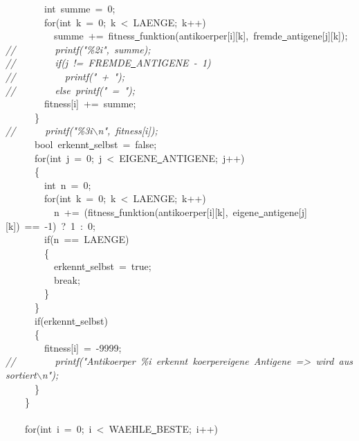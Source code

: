 {\ \ \ \ \ \ \ \ int\ summe\ =\ 0;\\
\ \ \ \ \ \ \ \ for(int\ k\ =\ 0;\ k\ <{}\ LAENGE;\ k++)\\
\ \ \ \ \ \ \ \ \ \ summe\ +=\ fitness\underline\ funktion(antikoerper[i][k],\ fremde\underline\ antigene[j][k]);\\
\textsl{//\ \ \ \ \ \ \ \ printf("{}\%2i"{},\ summe);}\\
\textsl{//\ \ \ \ \ \ \ \ if(j\ !=\ FREMDE\underline\ ANTIGENE\ -{}\ 1)}\\
\textsl{//\ \ \ \ \ \ \ \ \ \ printf("{}\ +\ "{});}\\
\textsl{//\ \ \ \ \ \ \ \ else\ printf("{}\ =\ "{});}\\
\ \ \ \ \ \ \ \ fitness[i]\ +=\ summe;\\
\ \ \ \ \ \ \}\\
\textsl{//\ \ \ \ \ \ printf("{}\%3i$\backslash$n"{},\ fitness[i]);}\\
\ \ \ \ \ \ bool\ erkennt\underline\ selbst\ =\ false;\\
\ \ \ \ \ \ for(int\ j\ =\ 0;\ j\ <{}\ EIGENE\underline\ ANTIGENE;\ j++)\\
\ \ \ \ \ \ \{\\
\ \ \ \ \ \ \ \ int\ n\ =\ 0;\\
\ \ \ \ \ \ \ \ for(int\ k\ =\ 0;\ k\ <{}\ LAENGE;\ k++)\\
\ \ \ \ \ \ \ \ \ \ n\ +=\ (fitness\underline\ funktion(antikoerper[i][k],\ eigene\underline\ antigene[j][k])\ ==\ -{}1)\ ?\ 1\ :\ 0;\\
\ \ \ \ \ \ \ \ if(n\ ==\ LAENGE)\\
\ \ \ \ \ \ \ \ \{\\
\ \ \ \ \ \ \ \ \ \ erkennt\underline\ selbst\ =\ true;\\
\ \ \ \ \ \ \ \ \ \ break;\\
\ \ \ \ \ \ \ \ \}\\
\ \ \ \ \ \ \}\\
\ \ \ \ \ \ if(erkennt\underline\ selbst)\\
\ \ \ \ \ \ \{\\
\ \ \ \ \ \ \ \ fitness[i]\ =\ -{}9999;\\
\textsl{//\ \ \ \ \ \ \ \ printf("{}Antikoerper\ \%i\ erkennt\ koerpereigene\ Antigene\ =>{}\ wird\ aussortiert$\backslash$n"{});}\\
\ \ \ \ \ \ \}\\
\ \ \ \ \}\\
\ \\
\ \ \ \ for(int\ i\ =\ 0;\ i\ <{}\ WAEHLE\underline\ BESTE;\ i++)\\
}
